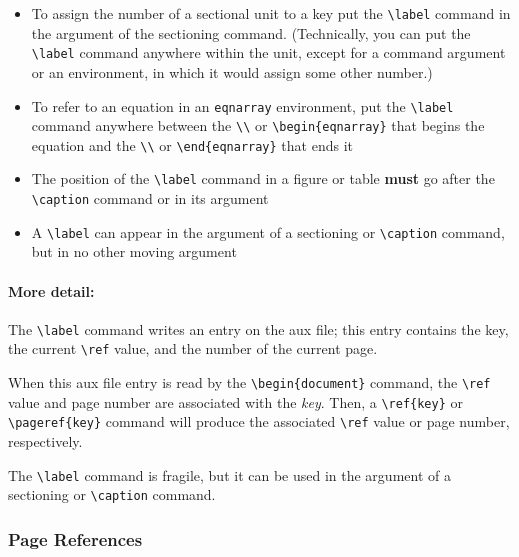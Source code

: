 \documentclass{article}
\begin{document}
\begin{itemize}
   
   \item To assign the number of a sectional unit to a key put the \verb:\label: command in the
    argument of the sectioning command. (Technically, you can put the \verb:\label: command
    anywhere within the unit, except for a command argument or an environment, in which it would
    assign some other number.)

   \item To refer to an equation in an {\tt eqnarray} environment, put the \verb:\label: command 
    anywhere between 
    the \verb:\\: or \verb:\begin{eqnarray}: that begins the equation 
    and the \verb:\\: or \verb:\end{eqnarray}: that ends it

   \item The position of the \verb:\label: command in a figure or table \textbf{must} go after
    the \verb:\caption: command or in its argument
    
   \item A \verb:\label: can appear in the argument of a sectioning or \verb:\caption:
    command, but in no other moving argument

\end{itemize}

\paragraph{More detail:} The \verb:\label: command writes an entry on the aux file; this entry
contains the key, the current \verb:\ref: value, and the number of the current page. 
 
When this aux file entry is read by the \verb:\begin{document}: command, 
the \verb:\ref: value and page number are associated with the \emph{key}. 
Then, a \verb:\ref{key}: or \verb:\pageref{key}: command will produce the associated 
\verb:\ref: value or page number, respectively.
 
The \verb:\label: command is fragile, but it can be used in the argument of
a sectioning or \verb:\caption: command.

\subsubsection{Page References}
\end{document}

